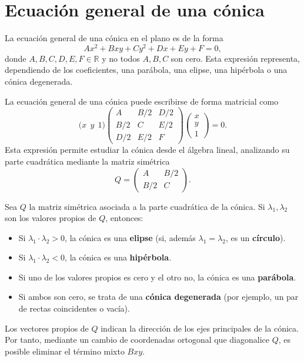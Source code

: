 \documentclass[a4,11pt]{aleph-notas}
\begin{document}
\section{Ecuación general de una cónica}

\begin{defi}
    La ecuación general de una cónica en el plano es de la forma
    \[
        Ax^2 + Bxy + Cy^2 + Dx + Ey + F = 0,
    \]
    donde \( A, B, C, D, E, F \in \mathbb{R} \) y no todos \( A, B, C \) son cero. Esta expresión representa, dependiendo de los coeficientes, una parábola, una elipse, una hipérbola o una cónica degenerada.
\end{defi}

\begin{defi}
    La ecuación general de una cónica puede escribirse de forma matricial como
    \[
        \big(
        x \ \ y \ \ 1
        \big)
        \begin{pmatrix}
        A & B/2 & D/2 \\
        B/2 & C & E/2 \\
        D/2 & E/2 & F
        \end{pmatrix}
        \begin{pmatrix}
        x \\ y \\ 1
        \end{pmatrix}
         = 0.
    \]
    Esta expresión permite estudiar la cónica desde el álgebra lineal, analizando su parte cuadrática mediante la matriz simétrica
    \[
        Q = \begin{pmatrix}
        A & B/2 \\
        B/2 & C
        \end{pmatrix}.
    \]
\end{defi}

\begin{teo}
    Sea \( Q \) la matriz simétrica asociada a la parte cuadrática de la cónica. Si \( \lambda_1, \lambda_2 \) son los valores propios de \( Q \), entonces:
    \begin{itemize}
        \item Si \( \lambda_1 \cdot \lambda_2 > 0 \), la cónica es una \textbf{elipse} (si, además \( \lambda_1 = \lambda_2 \), es un \textbf{círculo}).
        \item Si \( \lambda_1 \cdot \lambda_2 < 0 \), la cónica es una \textbf{hipérbola}.
        \item Si uno de los valores propios es cero y el otro no, la cónica es una \textbf{parábola}.
        \item Si ambos son cero, se trata de una \textbf{cónica degenerada} (por ejemplo, un par de rectas coincidentes o vacía).
    \end{itemize}
\end{teo}

\begin{advertencia}
    Los vectores propios de \( Q \) indican la dirección de los ejes principales de la cónica. Por tanto, mediante un cambio de coordenadas ortogonal que diagonalice \( Q \), es posible eliminar el término mixto \( Bxy \).
\end{advertencia}
\end{document}

